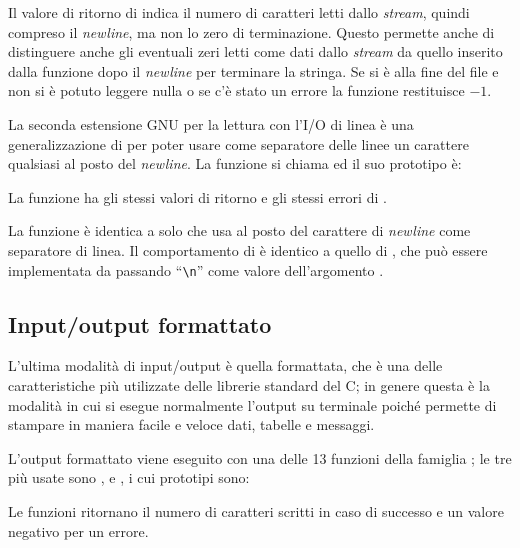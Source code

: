 Il valore di ritorno di  indica il numero di caratteri letti
dallo \textit{stream}, quindi compreso il \textit{newline}, ma non lo zero di
terminazione. Questo permette anche di distinguere anche gli eventuali zeri
letti come dati dallo \textit{stream} da quello inserito dalla funzione dopo
il \textit{newline} per terminare la stringa.  Se si è alla fine del file e
non si è potuto leggere nulla o se c'è stato un errore la funzione restituisce
$-1$.

La seconda estensione GNU per la lettura con l'I/O di linea è una
generalizzazione di  per poter usare come separatore delle linee
un carattere qualsiasi al posto del \textit{newline}. La funzione si chiama
 ed il suo prototipo è:

\begin{funcproto}{
}

{La funzione ha gli stessi valori di ritorno e gli stessi errori di
  .}
\end{funcproto}

La funzione è identica a  solo che usa  al posto
del carattere di \textit{newline} come separatore di linea. Il comportamento
di  è identico a quello di , che può essere
implementata da  passando ``\verb|\n|'' come valore
dell'argomento .


\subsection{Input/output formattato}
\label{sec:file_formatted_io}

L'ultima modalità di input/output è quella formattata, che è una delle
caratteristiche più utilizzate delle librerie standard del C; in genere questa
è la modalità in cui si esegue normalmente l'output su terminale poiché
permette di stampare in maniera facile e veloce dati, tabelle e messaggi.

L'output formattato viene eseguito con una delle 13 funzioni della famiglia
; le tre più usate sono ,  e
, i cui prototipi sono:

\begin{funcproto}{
}

{Le funzioni ritornano il numero di caratteri scritti in caso di successo e un
  valore negativo per un errore.}  
\end{funcproto}



